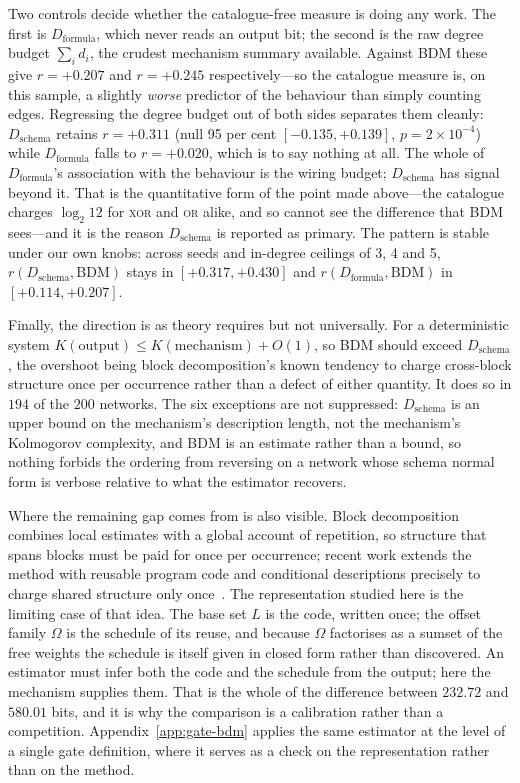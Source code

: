 \documentclass[11pt]{article}
\begin{document}
Two controls decide whether the catalogue-free measure is doing any work.  The
first is $D_{\mathrm{formula}}$, which never reads an output bit; the second is
the raw degree budget $\sum_i d_i$, the crudest mechanism summary available.
Against BDM these give $r=+0.207$ and $r=+0.245$ respectively---so the
catalogue measure is, on this sample, a slightly \emph{worse} predictor of the
behaviour than simply counting edges.  Regressing the degree budget out of both
sides separates them cleanly: $D_{\mathrm{schema}}$ retains $r=+0.311$
(null 95 per cent $[-0.135,+0.139]$, $p=2\times10^{-4}$) while
$D_{\mathrm{formula}}$ falls to $r=+0.020$, which is to say nothing at all.
The whole of $D_{\mathrm{formula}}$'s association with the behaviour is the
wiring budget; $D_{\mathrm{schema}}$ has signal beyond it.  That is the
quantitative form of the point made above---the catalogue charges $\log_2 12$
for \textsc{xor} and \textsc{or} alike, and so cannot see the difference that
BDM sees---and it is the reason $D_{\mathrm{schema}}$ is reported as primary.
The pattern is stable under our own knobs: across seeds and in-degree ceilings
of 3, 4 and 5, $r(D_{\mathrm{schema}},\mathrm{BDM})$ stays in
$[+0.317,+0.430]$ and $r(D_{\mathrm{formula}},\mathrm{BDM})$ in
$[+0.114,+0.207]$.

Finally, the direction is as theory requires but not universally.  For a
deterministic system $K(\text{output}) \le K(\text{mechanism}) + O(1)$, so BDM
should exceed $D_{\mathrm{schema}}$, the overshoot being block decomposition's
known tendency to charge cross-block structure once per occurrence rather than
a defect of either quantity.  It does so in $194$ of the $200$ networks.  The
six exceptions are not suppressed: $D_{\mathrm{schema}}$ is an upper bound on
the mechanism's description length, not the mechanism's Kolmogorov complexity,
and BDM is an estimate rather than a bound, so nothing forbids the ordering
from reversing on a network whose schema normal form is verbose relative to
what the estimator recovers.

Where the remaining gap comes from is also visible.  Block decomposition
combines local estimates with a global account of repetition, so structure
that spans blocks must be paid for once per occurrence; recent work extends
the method with reusable program code and conditional descriptions precisely
to charge shared structure only once~\cite{sakabe2026reusable}.  The
representation studied here is the limiting case of that idea.  The base set
$L$ is the code, written once; the offset family $\Omega$ is the schedule of
its reuse, and because $\Omega$ factorises as a sumset of the free weights the
schedule is itself given in closed form rather than discovered.  An estimator
must infer both the code and the schedule from the output; here the mechanism
supplies them.  That is the whole of the difference between $232.72$ and
$580.01$ bits, and it is why the comparison is a calibration rather than a
competition.  Appendix~\ref{app:gate-bdm} applies the same estimator at the
level of a single gate definition, where it serves as a check on the
representation rather than on the method.
\end{document}
